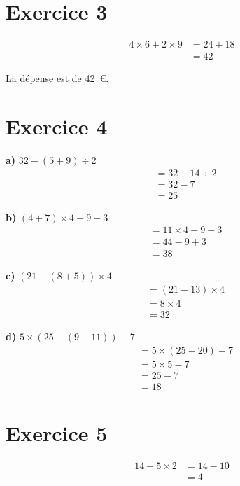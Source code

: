 \documentclass[12pt]{extarticle}
\begin{document}
\section*{Exercice 3}
\begin{align*}
4 \times 6 + 2 \times 9 &= 24 + 18 \\
                        &= 42
\end{align*}

La dépense est de 42~€.

\section*{Exercice 4}

\textbf{a)} $32 - (5 + 9) \div 2$
\begin{align*}
&= 32 - 14 \div 2 \\
&= 32 - 7 \\
&= 25
\end{align*}

\textbf{b)} $(4 + 7) \times 4 - 9 + 3$
\begin{align*}
&= 11 \times 4 - 9 + 3 \\
&= 44 - 9 + 3 \\
&= 38
\end{align*}

\textbf{c)} $(21 - (8 + 5)) \times 4$
\begin{align*}
&= (21 - 13) \times 4 \\
&= 8 \times 4 \\
&= 32
\end{align*}

\textbf{d)} $5 \times (25 - (9 + 11)) - 7$
\begin{align*}
&= 5 \times (25 - 20) - 7 \\
&= 5 \times 5 - 7 \\
&= 25 - 7 \\
&= 18
\end{align*}

\section*{Exercice 5}
\begin{align*}
14 - 5 \times 2 &= 14 - 10 \\
                &= 4
\end{align*}
\end{document}
